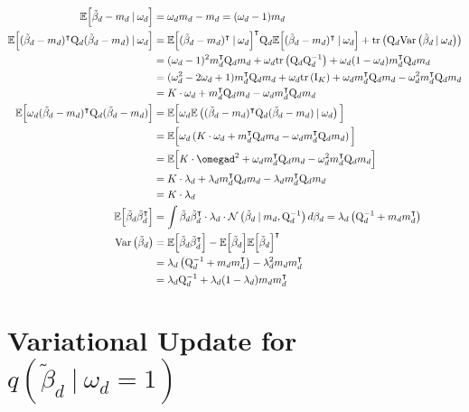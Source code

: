 \documentclass[twoside,11pt]{article}
\newcommand\given[1][]{\:#1\vert\:}
\newcommand{\transpose}[1]{#1^{\intercal}}
\newcommand{\E}{\mathbb{E}}
\newcommand{\betad}{\tilde{\beta}_d}
\newcommand{\qmat}{\mathrm{Q}}
\newcommand{\qbeta}{\mathcal{N} \left( \betad \given m_d, \qmat_d^{-1} \right)}
\newcommand{\trace}[1]{\mathrm{tr} \left( #1 \right)}
\newcommand{\var}[1]{\mathrm{Var}\left(#1\right)}
\begin{document}
\begin{align*}
	\E\Big[ \betad - m_d \given \omega_d \Big] &= \omega_d m_d - m_d = (\omega_d - 1) m_d \\
	\E \Big[ \transpose{(\betad - m_d)} \qmat_{d}(\betad - m_d) \given \omega_d \Big] &= \transpose{\E \Big[ \transpose{(\betad - m_d)} \given \omega_d \Big]} \qmat_d \E \Big[ \transpose{(\betad - m_d)} \given \omega_d \Big] + \trace{\qmat_d \var{\betad \given \omega_d}} \\
	&= (\omega_d-1)^2 \transpose{m_d} \qmat_d m_d + \omega_d \trace{\qmat_d \qmat_d^{-1}} + \omega_d(1-\omega_d)\transpose{m_d}\qmat_d m_d \\
	&= (\omega_d^2 - 2\omega_d + 1)\transpose{m_d} \qmat_d m_d + \omega_d \trace{\mathrm{I}_K} + \omega_d\transpose{m_d}\qmat_d m_d -\omega_d^2\transpose{m_d}\qmat_d m_d \\
	&= K \cdot \omega_d + \transpose{m_d}\qmat_d m_d - \omega_d \transpose{m_d}\qmat_d m_d \\
	\E \Big[ \omega_d \transpose{(\betad - m_d)} \qmat_{d}(\betad - m_d) \Big] &= \E \Big[ \omega_d \E \left(\transpose{(\betad - m_d)} \qmat_{d}(\betad - m_d) \given \omega_d \right) \Big]\\
	&= \E \Big[ \omega_d \left( K \cdot \omega_d + \transpose{m_d}\qmat_d m_d - \omega_d \transpose{m_d}\qmat_d m_d\right) \Big] \\
	&= \E \Big[ K \cdot \omegad^2 + \omega_d \transpose{m_d}\qmat_d m_d - \omega_d^2 \transpose{m_d}\qmat_d m_d \Big] \\
	&= K \cdot \lambda_d + \lambda_d \transpose{m_d}\qmat_d m_d - \lambda_d \transpose{m_d}\qmat_d m_d \\
	&= K \cdot \lambda_d \\
	\E \Big[ \betad \transpose{\betad} \Big] &= \int \betad \transpose{\betad} \cdot  \lambda_d \cdot 
\qbeta d\beta_d = \lambda_d \left( \qmat_d^{-1} + m_d \transpose{m_d} \right) \\
	\var{\betad} &= \E \Big[ \betad \transpose{\betad} \Big] - \E \Big[ \betad\Big] \transpose{\E \Big[ \betad\Big]} \\
	&= \lambda_d \left( \qmat_d^{-1} + m_d \transpose{m_d} \right) - \lambda_d^2 m_d \transpose{m_d} \\
	&= \lambda_d \qmat_d^{-1} + \lambda_d(1 - \lambda_d) m_d \transpose{m_d}
\end{align*}

\newpage


\section{Variational Update for $q(\betad \given \omega_d = 1)$}
\end{document}
